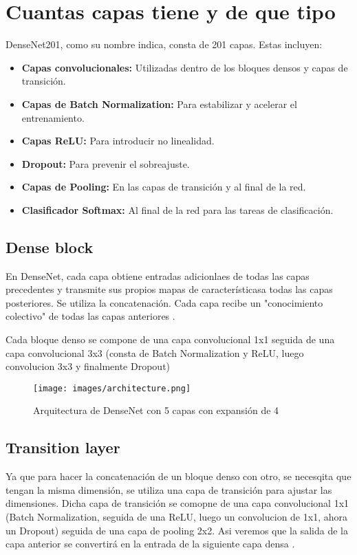 \documentclass{article}
\begin{document}
\section{Cuantas capas tiene y de que tipo}
DenseNet201, como su nombre indica, consta de 201 capas\cite{huang2018denselyconnectedconvolutionalnetworks}. Estas incluyen:
\begin{itemize}
    \item \textbf{Capas convolucionales:} Utilizadas dentro de los bloques densos y capas de transición.
    \item \textbf{Capas de Batch Normalization:} Para estabilizar y acelerar el entrenamiento.
    \item \textbf{Capas ReLU:} Para introducir no linealidad.
    \item \textbf{Dropout:} Para prevenir el sobreajuste.
    \item \textbf{Capas de Pooling:} En las capas de transición y al final de la red.
    \item \textbf{Clasificador Softmax:} Al final de la red para las tareas de clasificación.
\end{itemize}

\subsection{Dense block}
 En DenseNet, cada capa obtiene entradas adicionlaes de todas las capas precedentes y transmite sus propios mapas de característicasa todas las capas posteriores.
 Se utiliza la concatenación. Cada capa recibe un "conocimiento colectivo" de todas las capas anteriores \cite{densenet_review}. 

 Cada bloque denso se compone de una capa convolucional 1x1 seguida de una capa convolucional 3x3 (consta de Batch Normalization y ReLU, luego convolucion 3x3 y finalmente Dropout)
 
\begin{figure}[!ht]
    \centering
    \texttt{[image: images/architecture.png]}
    \caption{Arquitectura de DenseNet con 5 capas con expansión de 4}
\end{figure}

\subsection{Transition layer}
Ya que para hacer la concatenación de un bloque denso con otro, se necesqita que tengan la misma dimensión, se utiliza una capa de transición para ajustar las dimensiones.
Dicha capa de transición se comopne de una capa convolucional 1x1 (Batch Normalization, seguida de una ReLU, luego un convolucion de 1x1, ahora un Dropout)  seguida de una capa de pooling 2x2.
Asi veremos que la salida de la capa anterior se convertirá en la entrada de la siguiente capa densa \cite{densenet_review}.
\end{document}
